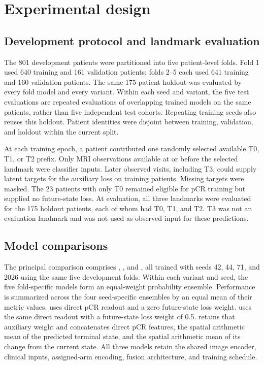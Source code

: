 \section{Experimental design}
\label{sec:experiments}
\subsection{Development protocol and landmark evaluation}
The 801 development patients were partitioned into five patient-level folds. Fold 1 used 640 training and 161 validation patients; folds 2--5 each used 641 training and 160 validation patients. The same 175-patient holdout was evaluated by every fold model and every variant. Within each seed and variant, the five test evaluations are repeated evaluations of overlapping trained models on the same patients, rather than five independent test cohorts. Repeating training seeds also reuses this holdout. Patient identities were disjoint between training, validation, and holdout within the current split.

At each training epoch, a patient contributed one randomly selected available T0, T1, or T2 prefix. Only MRI observations available at or before the selected landmark were classifier inputs. Later observed visits, including T3, could supply latent targets for the auxiliary loss on training patients. Missing targets were masked. The 23 patients with only T0 remained eligible for pCR training but supplied no future-state loss. At evaluation, all three landmarks were evaluated for the 175 holdout patients, each of whom had T0, T1, and T2. T3 was not an evaluation landmark and was not used as observed input for these predictions.

\subsection{Model comparisons}
The principal comparison comprises \nojepa{}, \direct{}, and \fullmodel{}, all trained with seeds 42, 44, 71, and 2026 using the same five development folds. Within each variant and seed, the five fold-specific models form an equal-weight probability ensemble. Performance is summarized across the four seed-specific ensembles by an equal mean of their metric values. \nojepa{} uses direct pCR readout and a zero future-state loss weight. \direct{} uses the same direct readout with a future-state loss weight of 0.5. \fullmodel{} retains that auxiliary weight and concatenates direct pCR features, the spatial arithmetic mean of the predicted terminal state, and the spatial arithmetic mean of its change from the current state. All three models retain the shared image encoder, clinical inputs, assigned-arm encoding, fusion architecture, and training schedule.

